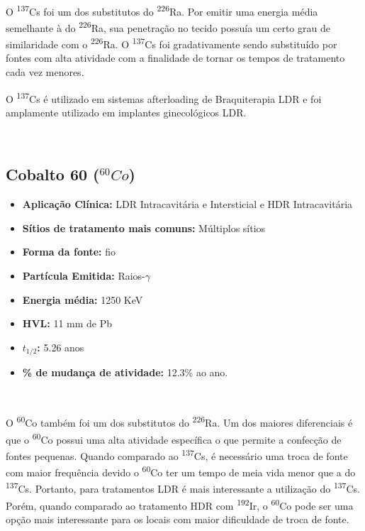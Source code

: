 \documentclass[11pt,a4paper]{article}
\begin{document}
			\

			O \textsuperscript{137}Cs foi um dos substitutos do \textsuperscript{226}Ra. Por emitir uma energia média semelhante à do \textsuperscript{226}Ra, sua penetração no tecido possuía um certo grau de similaridade com o \textsuperscript{226}Ra. O \textsuperscript{137}Cs foi gradativamente sendo substituído por fontes com alta atividade com a finalidade de tornar os tempos de tratamento cada vez menores.

			O \textsuperscript{137}Cs é utilizado em sistemas afterloading de Braquiterapia LDR e foi amplamente utilizado em implantes ginecológicos LDR.

			\

		\subsection{Cobalto 60 \textbf{\textcolor{CarnationPink}{(${}^{60}Co$)}}}
		


			\begin{itemize}
				\item \textbf{Aplicação Clínica:} LDR Intracavitária e Intersticial e HDR Intracavitária
				\item \textbf{Sítios de tratamento mais comuns:} Múltiplos sítios
				\item \textbf{Forma da fonte:} fio
				\item \textbf{Partícula Emitida:} Raios-$\gamma$
				\item \textbf{Energia média: } 1250 KeV
				\item \textbf{HVL:} 11 mm de Pb
				\item \textbf{$t_{1/2}$:} 5.26 anos
				\item \textbf{\% de mudança de atividade: } 12.3\% ao ano.
			\end{itemize}

			\

			O \textsuperscript{60}Co também foi um dos substitutos do \textsuperscript{226}Ra. Um dos maiores diferenciais é que o \textsuperscript{60}Co possui uma alta atividade específica o que permite a confecção de fontes pequenas. Quando comparado ao \textsuperscript{137}Cs, é necessário uma troca de fonte com maior frequência devido o \textsuperscript{60}Co ter um tempo de meia vida menor que a do \textsuperscript{137}Cs. Portanto, para tratamentos LDR é mais interessante a utilização do \textsuperscript{137}Cs. Porém, quando comparado ao tratamento HDR com \textsuperscript{192}Ir, o \textsuperscript{60}Co pode ser uma opção mais interessante para os locais com maior dificuldade de troca de fonte.
\end{document}
